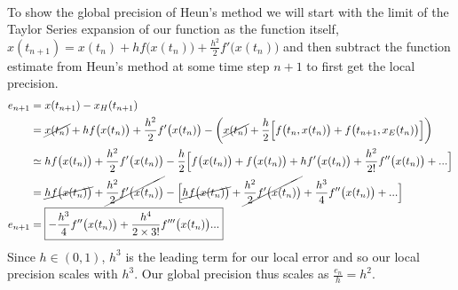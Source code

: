\documentclass[11pt, oneside]{article}   	%
\newcommand{\prob}[2]{
\indent \\
\noindent{\color{green!50!blue}\bf {\large#1.}}
{\normalfont #2}
}
\begin{document}
\prob{4}{To show the global precision of Heun's method we will start with the limit of the Taylor Series expansion of our function as the function itself, $x(t_{n+1}) = x(t_n) + h f\big(x(t_n)\big) + \frac{h^2}{2}f'\big(x(t_n)\big)$} and then subtract the function estimate from Heun's method at some time step $n+1$ to first get the local precision.
	\begin{align*}
		e_{n+1} &= x(t_{n+1}) - x_H(t_{n+1})
		\\
		&=
		\cancel{x(t_n)} + h f\big(x(t_n)\big) + \frac{h^2}{2}f'\big(x(t_n)\big)
		-
		\bigg(
		\cancel{x(t_n)} + \frac{h}{2}
			\Big[
			f\big(t_n,x(t_n)\big) + f\big(t_{n+1},x_E(t_n)\big)
			\Big]
		\bigg)
		\\
		&\simeq
		h f\big(x(t_n)\big) + \frac{h^2}{2}f'\big(x(t_n)\big)
		-
		\frac{h}{2}
			\Big[
			f\big(x(t_n)\big) + f\big(x(t_n)\big) + h f'\big(x(t_n)\big) + \frac{h^2}{2!}f''\big(x(t_n)\big) + ...
			\Big]
		\\
		&=
		\cancel{h f\big(x(t_n)\big)}
		+
		\cancel{\frac{h^2}{2}f'\big(x(t_n)\big)}
		-
		\Big[
			\cancel{h f\big(x(t_n)\big)}
			+
			\cancel{\frac{h^2}{2} f'\big(x(t_n)\big)}
			+
			\frac{h^3}{4}f''\big(x(t_n)\big)
			+ ...
		\Big]
		\\
		e_{n+1}
		&=
		\boxed{
		-
		\frac{h^3}{4}f''\big(x(t_n)\big)
		+
		\frac{h^4}{2\times3!}f'''\big(x(t_n)\big)...
		}
	\end{align*}
	Since $h \in (0,1)$, $h^3$ is the leading term for our local error and so our local precision scales with $h^3$. Our global precision thus scales as $\boxed{\frac{e_n}{h} = h^2}$.

\prob{5}{}

\prob{6}{}
\end{document}
